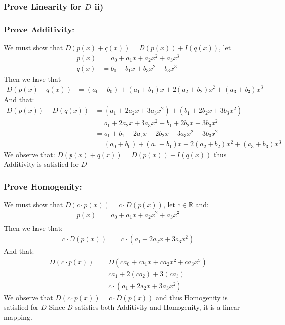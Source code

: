 \documentclass{article}
\begin{document}
\subsubsection*{Prove Linearity for $D$ ii)}
\subsubsection*{Prove Additivity:}
We must show that $D(p(x)+q(x))=D(p(x))+I(q(x))$, let $$\begin{aligned}
   p(x)&=a_{0}+a_{1}x+a_{2}x^{2}+a_{3}x^{3}\\
   q(x)&=b_{0}+b_{1}x+b_{3}x^{2}+b_{3}x^{3}
\end{aligned}$$
Then we have that $$\begin{aligned}
    D(p(x)+q(x))&= (a_{0}+b_{0})+(a_{1}+b_{1})x+2(a_{2}+b_{2})x^{2}+(a_{3}+b_{3})x^{3}
\end{aligned}$$
And that: $$\begin{aligned}
    D(p(x))+D(q(x))&=(a_{1}+2a_{2}x+3a_{3}x^{2})+(b_{1}+2b_{2}x+3b_{3}x^{2})\\
    &=a_{1}+2a_{2}x+3a_{3}x^{2}+b_{1}+2b_{2}x+3b_{3}x^{2}\\
    &=a_{1}+b_{1}+2a_{2}x+2b_{2}x+3a_{3}x^{2}+3b_{3}x^{2}\\
    &=(a_{0}+b_{0})+(a_{1}+b_{1})x+2(a_{2}+b_{2})x^{2}+(a_{3}+b_{3})x^{3}
\end{aligned}$$
We observe that: $D(p(x)+q(x))=D(p(x))+I(q(x))$ thus Additivity is satisfied for $D$
\subsubsection*{Prove Homogenity:}
We must show that $D(c\cdot p(x))=c\cdot D(p(x))$, let $c\in\mathbb{R}$ and:
$$\begin{aligned}
   p(x)&=a_{0}+a_{1}x+a_{2}x^{2}+a_{3}x^{3}\\
\end{aligned}$$
Then we have that: $$\begin{aligned}
   c\cdot D(p(x)) &= c\cdot (a_{1}+2a_{2}x+3a_{3}x^{2})
\end{aligned}$$
And that: $$\begin{aligned}
    D(c\cdot p(x))&=D(ca_{0}+ca_{1}x+ca_{2}x^{2}+ca_{3}x^{3})\\
    &=ca_{1}+2(ca_{2})+3(ca_{3})\\
    &= c\cdot (a_{1}+2a_{2}x+3a_{3}x^{2})
\end{aligned}$$
We observe that $D(c\cdot p(x))=c\cdot D(p(x))$ and thus Homogenity is satisfied for $D$
Since $D$ satisfies both Additivity and Homogenity, it is a linear mapping.
\newpage
\end{document}
